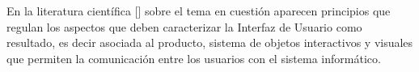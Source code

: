 

En la literatura científica [\cite{35}] sobre el tema en cuestión aparecen principios que regulan los aspectos que deben caracterizar la Interfaz de Usuario como resultado, es decir asociada al producto, sistema de objetos interactivos y visuales que permiten la comunicación entre los usuarios con el sistema informático.

